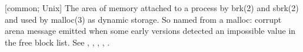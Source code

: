 
[common; Unix] The area of memory attached to a process by brk(2) and sbrk(2)
and used by malloc(3) as dynamic storage. So named from a malloc: corrupt arena
message emitted when some early versions detected an impossible value in the
free block list. See , ,
, , .

